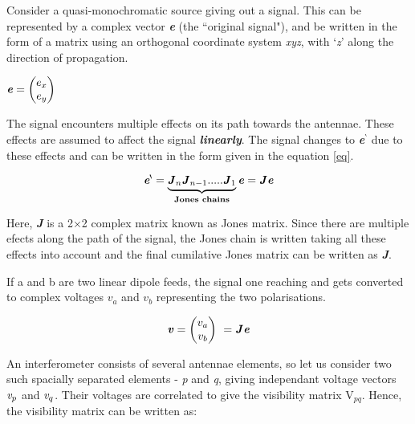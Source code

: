 \documentclass[../main/thesis_msc.tex]{subfiles}
\begin{document}
\noindent Consider a quasi-monochromatic source giving out a signal. This can be represented by a complex vector \textbf{\textit{e}} (the ``original signal"), and be written in the form of a matrix using an orthogonal coordinate system \textit{xyz}, with `\textit{z}' along the direction of propagation.

\begin{center}
\(
\textbf{\textit{e}} = 
  \begin{pmatrix}
    e_x \\
    e_y
  \end{pmatrix}
\)
\end{center}

\noindent The signal encounters multiple effects on its path towards the antennae. These effects are assumed to affect the signal \textit{\textbf{linearly}}. The signal changes to \textbf{\textit{e$^\backprime$}} due to these effects and can be written in the form given in the equation \ref{eq}.

\begin{equation}
\textbf{\textit{e$^{\backprime}$}} = \underbrace{\textbf{\textit{J}}_n \textbf{\textit{J}}_{n-1} ..... \textbf{\textit{J}}_1}_{\textbf{Jones chains}} \textbf{\textit{e}} = \textbf{\textit{J}} \textbf{\textit{e}} 
\label{eq}
\end{equation}

\noindent Here, \textit{\textbf{J}} is a 2$\times$2 complex matrix known as Jones matrix. Since there are multiple efects along the path of the signal, the Jones chain is written taking all these effects into account and the final cumilative Jones matrix can be written as \textit{\textbf{J}}.

\noindent If a and b are two linear dipole feeds, the signal one reaching and gets converted to complex voltages $v_a$ and $v_b$ representing the two polarisations. 

\begin{equation}
\textrm{
\(
\textbf{\textit{v}} = 
  \begin{pmatrix}
    v_a \\
    v_b
  \end{pmatrix}
\ = \textbf{\textit{J}} \textbf{\textit{e}} \)
}
\label{J}
\end{equation}

\noindent An interferometer consists of several antennae elements, so let us consider two such spacially separated elements - \textit{p} and \textit{q}, giving independant voltage vectors $\emph{v}_p$ and $\emph{v}_q$.  Their voltages are correlated to give the visibility matrix V$_{pq}$. Hence, the visibility matrix can be written as:
\end{document}
